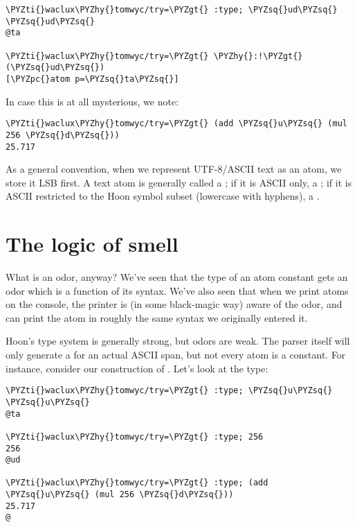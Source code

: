 \begin{framed_shaded}
\begin{Verbatim}[fontsize=\relsize{-2.5},fontseries=b,commandchars=\\\{\}]
\PYZti{}waclux\PYZhy{}tomwyc/try=\PYZgt{} :type; \PYZsq{}ud\PYZsq{}
\PYZsq{}ud\PYZsq{}
@ta

\PYZti{}waclux\PYZhy{}tomwyc/try=\PYZgt{} \PYZhy{}:!\PYZgt{}(\PYZsq{}ud\PYZsq{})
[\PYZpc{}atom p=\PYZsq{}ta\PYZsq{}]
\end{Verbatim}
\end{framed_shaded}

In case this is at all mysterious, we note:

\begin{framed_shaded}
\begin{Verbatim}[fontsize=\relsize{-2.5},fontseries=b,commandchars=\\\{\}]
\PYZti{}waclux\PYZhy{}tomwyc/try=\PYZgt{} (add \PYZsq{}u\PYZsq{} (mul 256 \PYZsq{}d\PYZsq{}))
25.717
\end{Verbatim}
\end{framed_shaded}

As a general convention, when we represent UTF-8/ASCII text as an
atom, we store it LSB first.  A text atom is generally called a
; if it is ASCII only, a ; if it is ASCII restricted
to the Hoon symbol subset (lowercase with hyphens), a .

\section{The logic of smell}

What is an odor, anyway?  We've seen that the type of an atom
constant gets an odor which is a function of its syntax.  We've
also seen that when we print atoms on the console, the printer is
(in some black-magic way) aware of the odor, and can print the
atom in roughly the same syntax we originally entered it.

Hoon's type system is generally strong, but odors are weak.  The
parser itself will only generate a  for an actual ASCII
span, but not every atom is a constant.  For instance, consider
our construction of .  Let's look at the type:

\begin{framed_shaded}
\begin{Verbatim}[fontsize=\relsize{-2.5},fontseries=b,commandchars=\\\{\}]
\PYZti{}waclux\PYZhy{}tomwyc/try=\PYZgt{} :type; \PYZsq{}u\PYZsq{}
\PYZsq{}u\PYZsq{}
@ta

\PYZti{}waclux\PYZhy{}tomwyc/try=\PYZgt{} :type; 256
256
@ud

\PYZti{}waclux\PYZhy{}tomwyc/try=\PYZgt{} :type; (add \PYZsq{}u\PYZsq{} (mul 256 \PYZsq{}d\PYZsq{}))
25.717
@
\end{Verbatim}
\end{framed_shaded}

